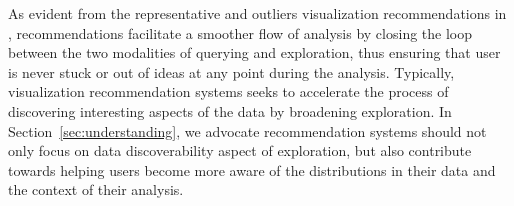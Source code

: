 \par As evident from the representative and outliers visualization recommendations in \zv, recommendations facilitate a smoother flow of analysis by closing the loop between the two modalities of querying and exploration, thus ensuring that user is never stuck or out of ideas at any point during the analysis. Typically, visualization recommendation systems seeks to accelerate the process of discovering interesting aspects of the data by broadening exploration. In Section~\ref{sec:understanding}, we advocate recommendation systems should not only focus on data discoverability aspect of exploration, but also contribute towards helping users become more aware of the distributions in their data and the context of their analysis.

